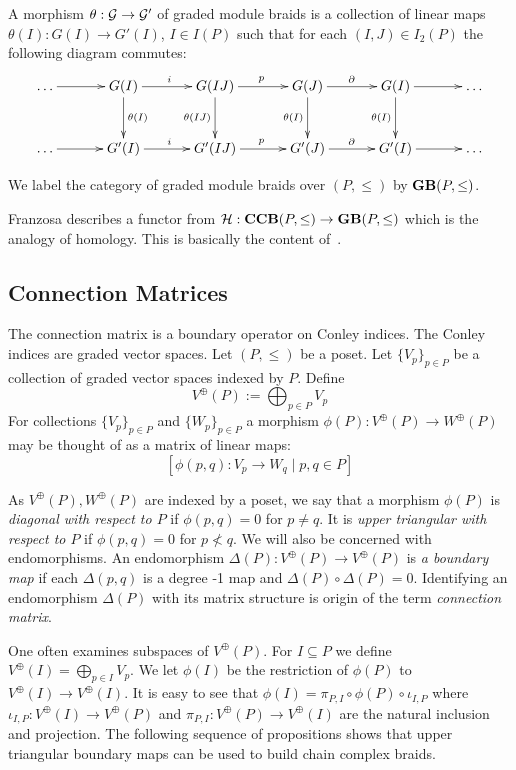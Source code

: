 A morphism $\theta:{\mathcal G}\to {\mathcal G}'$ of graded module braids is a collection of linear maps $\theta(I):G(I)\to G'(I)$, $I\in I(P)$ such that for each $(I,J)\in I_2(P)$ the following diagram commutes:
\[
\xymatrixrowsep{0.4in}
\xymatrixcolsep{0.45in}
\xymatrix{
\ldots \ar@{->}[r] & G(I) \ar@{->}[d]^{\theta(I)} \ar@{->}[r]^{i} & G(IJ) \ar@{->}[d]_{\theta(IJ)} \ar@{->}[r]^{p} & G(J) \ar@{->}[d]_{\theta(I)} \ar@{->}[r]^{\partial} & G(I) \ar@{->}[d]_{\theta(I)} \ar@{->}[r] & \ldots\\
\ldots \ar@{->}[r] & G'(I) \ar@{->}[r]^{i} & G'(IJ) \ar@{->}[r]^{p} & G'(J) \ar@{->}[r]^{\partial} & G'(I) \ar@{->}[r] &\ldots
}
\]

We label the category of graded module braids over $(P,\leq)$ by ${\bf GB}(P,\leq)$.

Franzosa describes a functor from ${\mathcal H}:{\bf CCB}(P,\leq)\to {\bf GB}(P,\leq)$ which is the analogy of homology.  This is basically the content of~\cite[Proposition 2.7]{fran}.

\subsection{Connection Matrices}

The connection matrix is a boundary operator on Conley indices.  The Conley indices are graded vector spaces.  Let $(P,\leq)$ be a poset.  Let $\{V_p\}_{p\in P}$ be a collection of graded vector spaces indexed by $P$.  Define $$V^\oplus(P) := \bigoplus_{p\in P} V_p$$  For collections $\{V_p\}_{p\in P}$ and $\{W_p\}_{p\in P}$ a morphism $\phi(P):V^\oplus(P)\to W^\oplus(P)$ may be thought of as a matrix of linear maps: $$[\phi(p,q):V_p\to W_q\mid p,q\in P]$$


As $V^\oplus(P),W^\oplus(P)$ are indexed by a poset, we say that a morphism $\phi(P)$ is {\em diagonal with respect to $P$} if $\phi(p,q)=0$ for $p\neq q$.  It is {\em upper triangular with respect to $P$} if $\phi(p,q)=0$ for $p\nless q$.  We will also be concerned with endomorphisms.  An endomorphism $\Delta(P):V^\oplus(P)\to V^\oplus(P)$ is {\em a boundary map} if each $\Delta(p,q)$ is a degree -1 map and $\Delta(P)\circ \Delta(P) = 0$.  Identifying an endomorphism $\Delta(P)$ with its matrix structure is origin of the term {\em connection matrix}.  

One often examines subspaces of $V^\oplus(P)$.  For $I\subseteq P$ we define $V^\oplus(I)= \bigoplus_{p\in I} V_p$.  We let $\phi(I)$ be the restriction of $\phi(P)$ to $V^\oplus(I)\to V^\oplus(I)$.  It is easy to see that $\phi(I) = \pi_{P,I} \circ \phi(P) \circ \iota_{I,P}$ where $\iota_{I,P}:V^\oplus(I)\to V^\oplus(P)$ and $\pi_{P,I}:V^\oplus(P)\to V^\oplus(I)$ are the natural inclusion and projection.  The following sequence of propositions shows that upper triangular boundary maps can be used to build chain complex braids.




